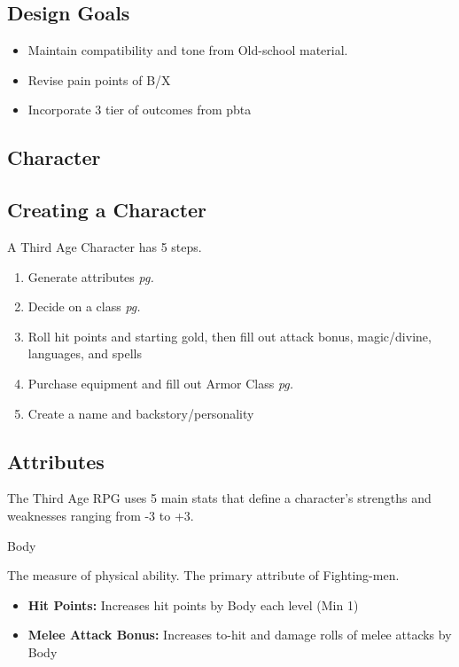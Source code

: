 \documentclass[18pt]{article}
\begin{document}
\subsection*{Design Goals}
\begin{itemize}
	\item Maintain compatibility and tone from Old-school material.
        \item Revise pain points of B/X
        \item Incorporate 3 tier of outcomes from pbta
\end{itemize}
\begin{multicols}{2}
\section*{Character}
\subsection*{Creating a Character}
A Third Age Character has 5%
steps.
\begin{enumerate}
	\item Generate attributes \emph{pg. \pageref{label:Attributes}}
	\item Decide on a class \emph{pg. \pageref{label:Class}}
	\item Roll hit points and starting gold, then fill out attack bonus, magic/divine, languages, and spells
	\item Purchase equipment and fill out Armor Class \emph{pg. \pageref{section:Equipment}}
	\item Create a name and backstory/personality %
\end{enumerate}


\subsection*{Attributes}
\label{label:Attributes}
The Third Age RPG uses 5 main stats that define a character's strengths and weaknesses ranging from -3 to +3. 

\begin{mercHeading}
Body
\end{mercHeading}
The measure of physical ability. The primary attribute of Fighting-men.

\begin{itemize}
	\setlength\itemsep{0em}
	\item \textbf{Hit Points:} Increases hit points by Body each level (Min 1)
	\item \textbf{Melee Attack Bonus:} Increases to-hit and damage rolls of melee attacks by Body
\end{itemize}


\end{multicols}
\end{document}
